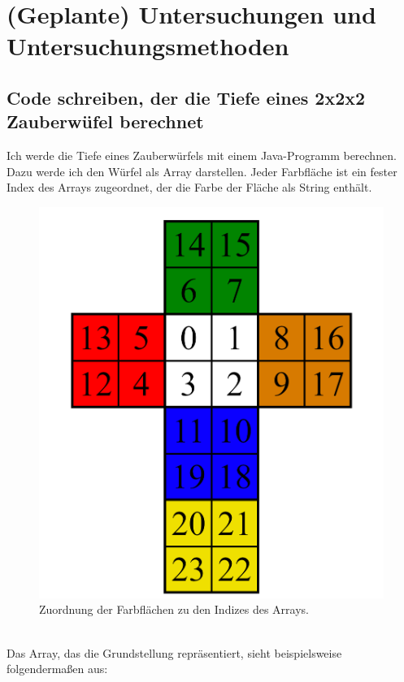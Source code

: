 \documentclass[12pt,a4paper, usenames, dvipsnames]{scrartcl}
\begin{document}
\newpage


\section{(Geplante) Untersuchungen und Untersuchungsmethoden}



\subsection*{Code schreiben, der die Tiefe eines 2x2x2 Zauberwüfel berechnet}

Ich werde die Tiefe eines Zauberwürfels mit einem Java-Programm berechnen. Dazu werde ich den Würfel als Array darstellen. Jeder Farbfläche ist ein fester Index des Arrays zugeordnet, der die Farbe der Fläche als String enthält. \\
\begin{figure}[h]
\centering
\includegraphics[scale=0.15]{2x2foldedout.png}
\caption{Zuordnung der Farbflächen zu den Indizes des Arrays.}
\end{figure}
\\
Das Array, das die Grundstellung repräsentiert, sieht beispielsweise folgendermaßen aus:
\end{document}
